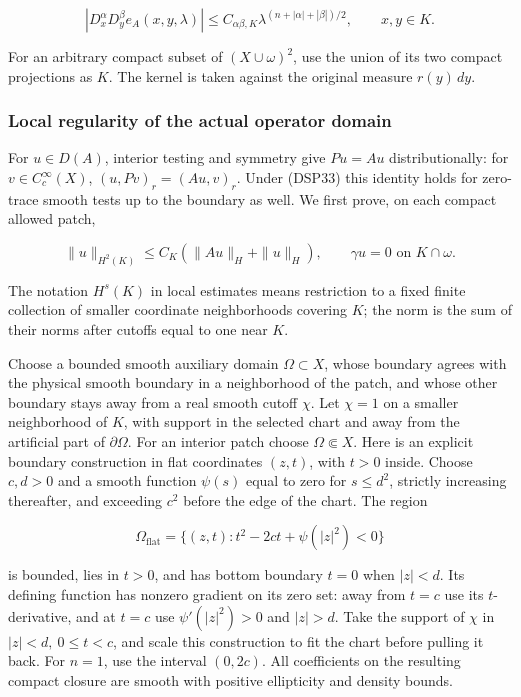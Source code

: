 \documentclass[
  11pt,
]{article}
\makeatletter
\let\ReaderOriginalAnchorStart\hyper@anchorstart
\let\ReaderOriginalAnchorEnd\hyper@anchorend
\let\ReaderPendingAliases\@empty
\def\ReaderArmAliases#1{\gdef\ReaderPendingAliases{#1}}
\def\hyper@anchorstart#1{\ReaderIfNativeAnchorTF{#1}{\ReaderPendingAliases\global\let\ReaderPendingAliases\@empty}{}\ReaderOriginalAnchorStart{#1}}
\makeatother
\begin{document}
\[
 |D_x^\alpha D_y^\beta e_A(x,y,\lambda)|
 \leq C_{\alpha\beta,K}\lambda^{(n+|\alpha|+|\beta|)/2},\qquad x,y\in K.
 \tag{DSP34}
\]

For an arbitrary compact subset of \((X\cup\omega)^2\), use the union of
its two compact projections as \(K\). The kernel is taken against the
original measure \(r(y)\,dy\).

\ReaderArmAliases{\ReaderOriginalAnchorStart{local-regularity-of-the-actual-operator-domain}\ReaderOriginalAnchorEnd}
\subsubsection{Local regularity of the actual operator
domain}\label{local-regularity-of-the-actual-operator-domain}

For \(u\in D(A)\), interior testing and symmetry give \(Pu=Au\)
distributionally: for \(v\in C_c^\infty(X)\), \((u,Pv)_r=(Au,v)_r\).
Under (DSP33) this identity holds for zero-trace smooth tests up to the
boundary as well. We first prove, on each compact allowed patch,

\[
 \|u\|_{H^2(K)}\leq C_K(\|Au\|_H+\|u\|_H),\qquad \gamma u=0\text{ on }K\cap\omega.
 \tag{DSP35}
\]

The notation \(H^s(K)\) in local estimates means restriction to a fixed
finite collection of smaller coordinate neighborhoods covering \(K\);
the norm is the sum of their norms after cutoffs equal to one near
\(K\).

Choose a bounded smooth auxiliary domain \(\Omega\subset X\), whose
boundary agrees with the physical smooth boundary in a neighborhood of
the patch, and whose other boundary stays away from a real smooth cutoff
\(\chi\). Let \(\chi=1\) on a smaller neighborhood of \(K\), with
support in the selected chart and away from the artificial part of
\(\partial\Omega\). For an interior patch choose \(\Omega\Subset X\).
Here is an explicit boundary construction in flat coordinates \((z,t)\),
with \(t>0\) inside. Choose \(c,d>0\) and a smooth function \(\psi(s)\)
equal to zero for \(s\leq d^2\), strictly increasing thereafter, and
exceeding \(c^2\) before the edge of the chart. The region

\[
 \Omega_{\mathrm{flat}}=\{(z,t):t^2-2ct+\psi(|z|^2)<0\}
\]

is bounded, lies in \(t>0\), and has bottom boundary \(t=0\) when
\(|z|<d\). Its defining function has nonzero gradient on its zero set:
away from \(t=c\) use its \(t\)-derivative, and at \(t=c\) use
\(\psi'(|z|^2)>0\) and \(|z|>d\). Take the support of \(\chi\) in
\(|z|<d,\ 0\leq t<c\), and scale this construction to fit the chart
before pulling it back. For \(n=1\), use the interval \((0,2c)\). All
coefficients on the resulting compact closure are smooth with positive
ellipticity and density bounds.
\end{document}
